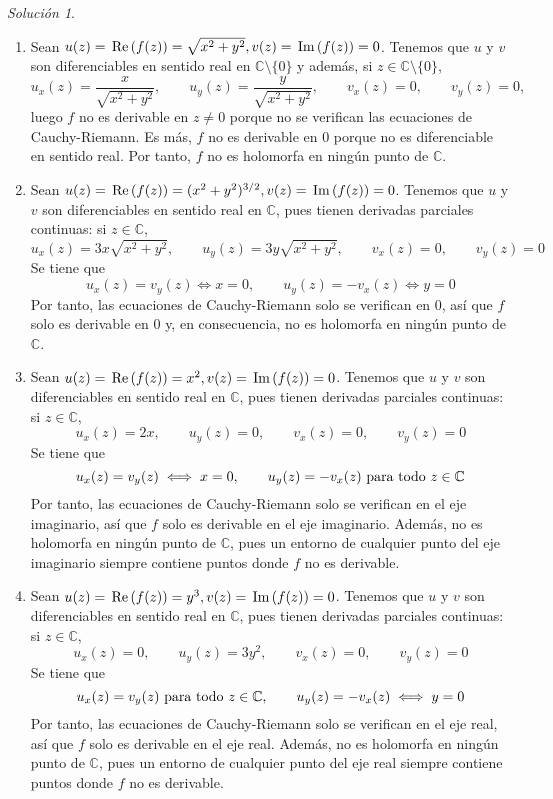 \documentclass[11pt]{report}
\newcommand{\C}{\mathbb C}
\newcommand{\pars}[1]{\left( #1 \right)} %
\renewcommand{\Re}[1]{\,\textup{Re}\pars{#1}}
\renewcommand{\Im}[1]{\,\textup{Im}\pars{#1}}
\theoremstyle{remark}
\newtheorem*{resolution}{Solución}
\begin{document}
\begin{resolution}
\hfill
\begin{enumerate}
    \item Sean $u(z) = \Re{f(z)} = \sqrt{x^2+y^2}, v(z) = \Im{f(z)} = 0$. Tenemos que $u$ y $v$ son diferenciables en sentido real en $\C \setminus \{0\}$ y además, si $z \in \C \setminus \{0\}$,
    \[u_x(z) = \frac{x}{\sqrt{x^2+y^2}}, \qquad u_y(z) = \frac{y}{\sqrt{x^2+y^2}}, \qquad v_x(z) = 0, \qquad v_y(z) = 0,\]
    luego $f$ no es derivable en $z \neq 0$ porque no se verifican las ecuaciones de Cauchy-Riemann. Es más, $f$ no es derivable en $0$ porque no es diferenciable en sentido real. Por tanto, $f$ no es holomorfa en ningún punto de $\C$.
    \item Sean $u(z) = \Re{f(z)} = (x^2+y^2)^{3/2}, v(z) = \Im{f(z)} = 0$. Tenemos que $u$ y $v$ son diferenciables en sentido real en $\C$, pues tienen derivadas parciales continuas: si $z \in \C$,
    \[u_x(z) = 3x\sqrt{x^2+y^2}, \qquad u_y(z) = 3y\sqrt{x^2+y^2}, \qquad v_x(z) = 0, \qquad v_y(z) = 0\]
    Se tiene que
    \[u_x(z) = v_y(z) \iff x = 0, \qquad u_y(z) = -v_x(z) \iff y = 0\]
    Por tanto, las ecuaciones de Cauchy-Riemann solo se verifican en $0$, así que $f$ solo es derivable en $0$ y, en consecuencia, no es holomorfa en ningún punto de $\C$.
    \item Sean $u(z) = \Re{f(z)} = x^2, v(z) = \Im{f(z)} = 0$. Tenemos que $u$ y $v$ son diferenciables en sentido real en $\C$, pues tienen derivadas parciales continuas: si $z \in \C$,
    \[u_x(z) = 2x, \qquad u_y(z) = 0, \qquad v_x(z) = 0, \qquad v_y(z) = 0\]
    Se tiene que
    \[u_x(z) = v_y(z) \iff x = 0, \qquad u_y(z) = -v_x(z) \textup{ para todo } z \in \C\]
    Por tanto, las ecuaciones de Cauchy-Riemann solo se verifican en el eje imaginario, así que $f$ solo es derivable en el eje imaginario. Además, no es holomorfa en ningún punto de $\C$, pues un entorno de cualquier punto del eje imaginario siempre contiene puntos donde $f$ no es derivable.
    \item Sean $u(z) = \Re{f(z)} = y^3, v(z) = \Im{f(z)} = 0$. Tenemos que $u$ y $v$ son diferenciables en sentido real en $\C$, pues tienen derivadas parciales continuas: si $z \in \C$,
    \[u_x(z) = 0, \qquad u_y(z) = 3y^2, \qquad v_x(z) = 0, \qquad v_y(z) = 0\]
    Se tiene que
    \[u_x(z) = v_y(z) \textup{ para todo } z \in \C, \qquad u_y(z) = -v_x(z) \iff y = 0\]
    Por tanto, las ecuaciones de Cauchy-Riemann solo se verifican en el eje real, así que $f$ solo es derivable en el eje real. Además, no es holomorfa en ningún punto de $\C$, pues un entorno de cualquier punto del eje real siempre contiene puntos donde $f$ no es derivable.
\end{enumerate}
\end{resolution}
\end{document}

